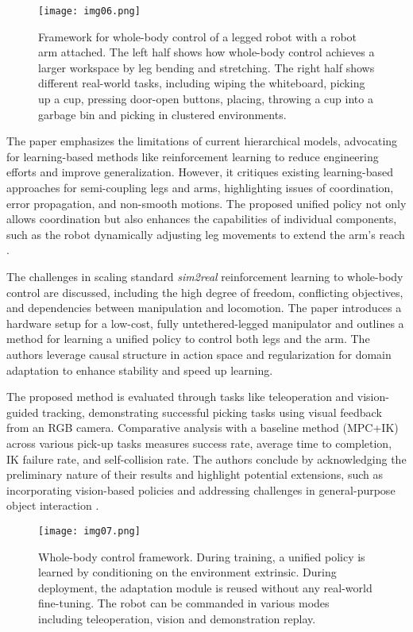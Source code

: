 \begin{figure}[t]
	\centering
	\texttt{[image: img06.png]}
	\captionsetup{width=1\linewidth}
	\caption{Framework for whole-body control of a legged robot with a robot arm attached.
		The left half shows how whole-body control achieves a larger workspace by leg bending and stretching.
		The right half shows different real-world tasks, including wiping the whiteboard, picking up a cup,
		pressing door-open buttons, placing, throwing a cup into a garbage bin and picking
		in clustered environments. \cite{fu2022deeplegged}}
	\label{fig:img06}
\end{figure}

The paper emphasizes the limitations of current hierarchical models, advocating for learning-based
methods like reinforcement learning to reduce engineering efforts and improve generalization.
However, it critiques existing learning-based approaches for semi-coupling legs and arms,
highlighting issues of coordination, error propagation, and non-smooth motions.
The proposed unified policy not only allows coordination but also enhances the capabilities
of individual components, such as the robot dynamically adjusting leg movements to extend
the arm's reach \cite{fu2022deeplegged}.

The challenges in scaling standard \textit{sim2real} reinforcement learning to whole-body control
are discussed, including the high degree of freedom, conflicting objectives, and dependencies
between manipulation and locomotion. The paper introduces a hardware setup for a low-cost, fully
untethered-legged manipulator and outlines a method for learning a unified policy to control
both legs and the arm. The authors leverage causal structure in action space and regularization
for domain adaptation to enhance stability and speed up learning.

The proposed method is evaluated through tasks like teleoperation and vision-guided tracking,
demonstrating successful picking tasks using visual feedback from an RGB camera.
Comparative analysis with a baseline method (MPC+IK) across various pick-up tasks measures success rate,
average time to completion, IK failure rate, and self-collision rate.
The authors conclude by acknowledging the preliminary nature of their results and highlight
potential extensions, such as incorporating vision-based policies and addressing challenges
in general-purpose object interaction \cite{fu2022deeplegged}.

\begin{figure}[t]
	\centering
	\texttt{[image: img07.png]}
	\captionsetup{width=1\linewidth}
	\caption{Whole-body control framework. During training, a unified policy is learned by conditioning on
		the environment extrinsic. During deployment, the adaptation module is reused without
		any real-world fine-tuning.
		The robot can be commanded in various modes including teleoperation, vision and demonstration replay.
		\cite{fu2022deeplegged}}
	\label{fig:img07}
\end{figure}

